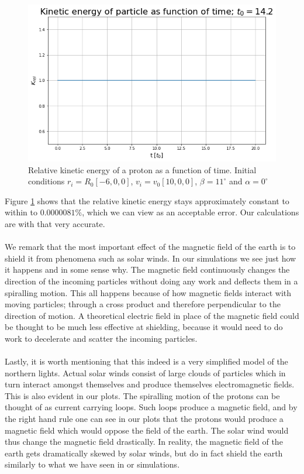 \begin{figure}[H]
    \centering
    \includegraphics[scale=.4]{Images/KinEnergy3.png}
    \caption{Relative kinetic energy of a proton as a function of time. Initial conditions $r_i=R_0[-6,0,0]$, $v_i=v_0[10,0,0]$, $\beta=11^{\circ}$ and $\alpha=0^{\circ}$}
    \label{fig:kinEnergy3}
\end{figure}

\noindent Figure \ref{fig:kinEnergy3} shows that the relative kinetic energy stays approximately constant to within to $0.0000081\%$, which we can view as an acceptable error. Our calculations are with that very accurate.\\
\\
We remark that the most important effect of the magnetic field of the earth is to shield it from phenomena such as solar winds. In our simulations we see just how it happens and in some sense why. The magnetic field continuously changes the direction of the incoming particles without doing any work and deflects them in a spiralling motion. This all happens because of how magnetic fields interact with moving particles; through a cross product and therefore perpendicular to the direction of motion. A theoretical electric field in place of the magnetic field could be thought to be much less effective at shielding, because it would need to do work to decelerate and scatter the incoming particles.\\
\\
Lastly, it is worth mentioning that this indeed is a very simplified model of the northern lights. Actual solar winds consist of large clouds of particles which in turn interact amongst themselves and produce themselves electromagnetic fields. This is also evident in our plots. The spiralling motion of the protons can be thought of as current carrying loops. Such loops produce a magnetic field, and by the right hand rule one can see in our plots that the protons would produce a magnetic field which would oppose the field of the earth. The solar wind would thus change the magnetic field drastically. In reality, the magnetic field of the earth gets dramatically skewed by solar winds, but do in fact shield the earth similarly to what we have seen in or simulations.\\